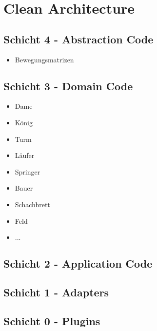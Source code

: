 \chapter{Clean Architecture}

\section*{Schicht 4 - Abstraction Code}

\begin{itemize}
    \item Bewegungsmatrizen
\end{itemize}

\section*{Schicht 3 - Domain Code}

\begin{itemize}
    \item Dame
    \item König
    \item Turm
    \item Läufer
    \item Springer
    \item Bauer
    \item Schachbrett
    \item Feld
    \item ...
\end{itemize}

\section*{Schicht 2 - Application Code}

\section*{Schicht 1 - Adapters}

\section*{Schicht 0 - Plugins}